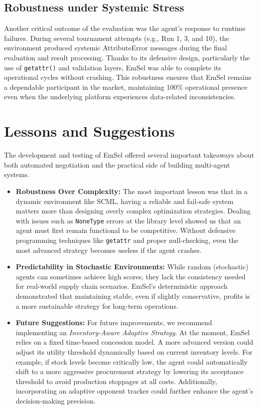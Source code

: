 \documentclass[a4paper,11pt]{article}
\begin{document}
	\subsection{Robustness under Systemic Stress}
	
	Another critical outcome of the evaluation was the agent’s response to runtime failures. During several tournament attempts (e.g., Run 1, 3, and 10), the environment produced systemic AttributeError messages during the final evaluation and result processing. Thanks to its defensive design, particularly the use of \texttt{getattr()} and validation layers, EmSel was able to complete its operational cycles without crashing. This robustness ensures that EmSel remains a dependable participant in the market, maintaining 100\% operational presence even when the underlying platform experiences data-related inconsistencies.
	
	\section{Lessons and Suggestions}
	
	The development and testing of EmSel offered several important takeaways about both automated negotiation and the practical side of building multi-agent systems.
	
	\begin{itemize}
		\item \textbf{Robustness Over Complexity:} The most important lesson was that in a dynamic environment like SCML, having a reliable and fail-safe system matters more than designing overly complex optimization strategies. Dealing with issues such as \texttt{NoneType} errors at the library level showed us that an agent must first remain functional to be competitive. Without defensive programming techniques like \texttt{getattr} and proper null-checking, even the most advanced strategy becomes useless if the agent crashes. 
		
		\item \textbf{Predictability in Stochastic Environments:} While random (stochastic) agents can sometimes achieve high scores, they lack the consistency needed for real-world supply chain scenarios. EmSel’s deterministic approach demonstrated that maintaining stable, even if slightly conservative, profits is a more sustainable strategy for long-term operations. 
		
		\item \textbf{Future Suggestions:} For future improvements, we recommend implementing an \textit{Inventory-Aware Adaptive Strategy}. At the moment, EmSel relies on a fixed time-based concession model. A more advanced version could adjust its utility threshold dynamically based on current inventory levels. For example, if stock levels become critically low, the agent could automatically shift to a more aggressive procurement strategy by lowering its acceptance threshold to avoid production stoppages at all costs. Additionally, incorporating an adaptive opponent tracker could further enhance the agent's decision-making precision.
	\end{itemize}
	
\end{document}
